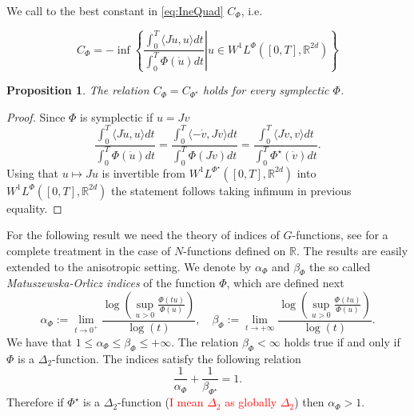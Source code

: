 \documentclass[twoside]{article}
\newtheorem{prop}[thm]{Proposition}
\theoremstyle{remark}
\newcommand{\rr}{\mathbb{R}}
\renewcommand{\leq}{\leqslant}
\newcommand{\Phie}{\Phi^{\star}}
\begin{document}
 We call to the best constant in \eqref{eq:IneQuad} $C_{\Phi}$, i.e.
 
\begin{equation}\label{eq:C-optima}
C_{\Phi}=-\inf\left\{\left.\frac{\int_0^T\langle J\dot{u},u\rangle dt}{\int_0^T\Phi(\dot{u})dt}\right|
u\in W^1L^{\Phi}\left([0,T],\rr^{2d}\right)\right\}
 \end{equation}
 
 
\begin{prop} The relation $C_{\Phi}=C_{\Phie}$ holds for every symplectic $\Phi$. 
 \end{prop}
 
 \begin{proof} Since $\Phi$ is symplectic if $u=Jv$
 \[
      \frac{\int_0^T\langle J\dot{u},u\rangle dt}{\int_0^T\Phi(\dot{u})dt}
      =
      \frac{\int_0^T\langle -\dot{v},Jv\rangle dt}{\int_0^T\Phi(J\dot{v})dt}
      =\frac{\int_0^T\langle J\dot{v},v\rangle dt}{\int_0^T\Phie(\dot{v})dt}.
   \]
 Using that $u\mapsto Ju$ is invertible from $W^1L^{\Phie}([0,T],\rr^{2d})$ into $W^1L^{\Phi}([0,T],\rr^{2d})$ the statement follows taking infimum in previous equality.
  
 \end{proof}

 
For the following result we need the theory of indices of $G$-functions, see \cite{fiorenza1997indices,Maligranda} for a complete treatment in the case of $N$-functions defined on $\rr$. The results are easily extended to the anisotropic setting.
We denote by $\alpha_{\Phi}$ and $\beta_{\Phi}$ the so called  \emph{Matuszewska-Orlicz indices} of the function $\Phi$, which are defined next
\begin{equation}\label{eq:MO_indices}
    \alpha_{\Phi}:=\lim\limits_{t\to 0^{+}}\frac{\log \left (\sup\limits_{u>0}\frac{\Phi(t u)}{\Phi(u)} \right ) }{\log(t)},\quad
    \beta_{\Phi}:=\lim\limits_{t\to +\infty}\frac{\log \left  (\sup\limits_{u>0}\frac{\Phi(t u)}{\Phi(u)}\right )}{\log(t)}.
\end{equation}
We have that $1\leq \alpha_{\Phi}\leq \beta_{\Phi}\leq +\infty$. The relation $\beta_{\Phi}<\infty$ holds true if and only if $\Phi$ is a
$\Delta_2$-function. The indices satisfy the following relation
\begin{equation}\label{inv_indices}
    \frac{1}{\alpha_{\Phi}}+\frac{1}{\beta_{\Phie}}=1.
\end{equation}
Therefore if $\Phie$ is a $\Delta_2$-function (\textcolor{red}{I mean $\Delta_2$ as globally $\Delta_2$}) then $\alpha_{\Phi}>1$. 
\end{document}
